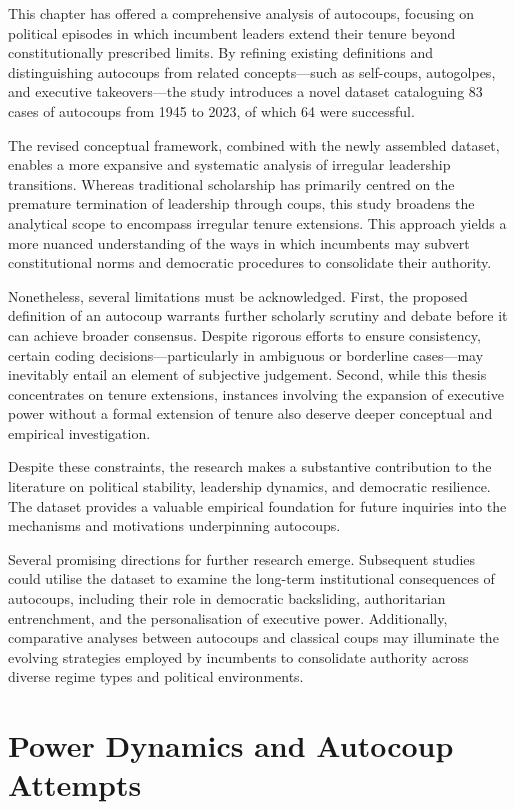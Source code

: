\documentclass[
  12pt,
]{report}
\begin{document}
This chapter has offered a comprehensive analysis of autocoups, focusing
on political episodes in which incumbent leaders extend their tenure
beyond constitutionally prescribed limits. By refining existing
definitions and distinguishing autocoups from related concepts---such as
self-coups, autogolpes, and executive takeovers---the study introduces a
novel dataset cataloguing 83 cases of autocoups from 1945 to 2023, of
which 64 were successful.

The revised conceptual framework, combined with the newly assembled
dataset, enables a more expansive and systematic analysis of irregular
leadership transitions. Whereas traditional scholarship has primarily
centred on the premature termination of leadership through coups, this
study broadens the analytical scope to encompass irregular tenure
extensions. This approach yields a more nuanced understanding of the
ways in which incumbents may subvert constitutional norms and democratic
procedures to consolidate their authority.

Nonetheless, several limitations must be acknowledged. First, the
proposed definition of an autocoup warrants further scholarly scrutiny
and debate before it can achieve broader consensus. Despite rigorous
efforts to ensure consistency, certain coding decisions---particularly
in ambiguous or borderline cases---may inevitably entail an element of
subjective judgement. Second, while this thesis concentrates on tenure
extensions, instances involving the expansion of executive power without
a formal extension of tenure also deserve deeper conceptual and
empirical investigation.

Despite these constraints, the research makes a substantive contribution
to the literature on political stability, leadership dynamics, and
democratic resilience. The dataset provides a valuable empirical
foundation for future inquiries into the mechanisms and motivations
underpinning autocoups.

Several promising directions for further research emerge. Subsequent
studies could utilise the dataset to examine the long-term institutional
consequences of autocoups, including their role in democratic
backsliding, authoritarian entrenchment, and the personalisation of
executive power. Additionally, comparative analyses between autocoups
and classical coups may illuminate the evolving strategies employed by
incumbents to consolidate authority across diverse regime types and
political environments.

\chapter{Power Dynamics and Autocoup Attempts}\label{sec-chapter2}
\end{document}
